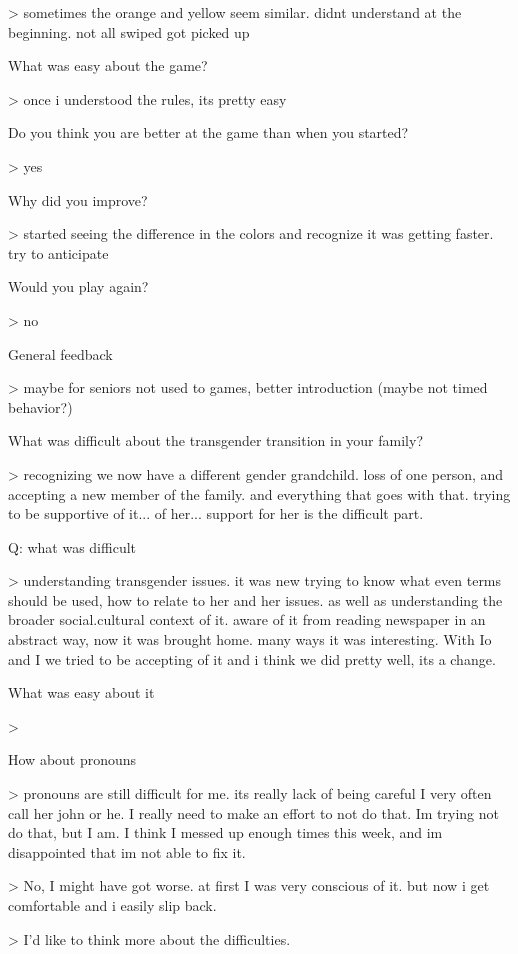     > sometimes the orange and yellow seem similar. didnt understand at the beginning. not all swiped got picked up

What was easy about the game?

    > once i understood the rules, its pretty easy
    
Do you think you are better at the game than when you started?

    > yes
    
Why did you improve?

    > started seeing the difference in the colors and recognize it was getting faster. try to anticipate
    
Would you play again?

    > no
    
General feedback

    > maybe for seniors not used to games, better introduction (maybe not timed behavior?)
    
What was difficult about the transgender transition in your family?
    
    > recognizing we now have a different gender grandchild. loss of one person, and accepting a new member of the family. and everything that goes with that. trying to be supportive of it... of her... support for her is the difficult part. 
    
    Q: what was difficult
    
        > understanding transgender issues. it was new trying to know what even terms should be used, how to relate to her and her issues. as well as understanding the broader social.cultural context of it. aware of it from reading newspaper in an abstract way, now it was brought home. many ways it was interesting. With Io and I we tried to be accepting of it and i think we did pretty well, its a change.

What was easy about it

    > 

How about pronouns

    > pronouns are still difficult for me. its really lack of being careful I very often call her john or he. I really need to make an effort to not do that. Im trying not do that, but I am. I think I messed up enough times this week, and im disappointed that im not able to fix it. 
    
    > No, I might have got worse. at first I was very conscious of it. but now i get comfortable and i easily slip back.
        
> I'd like to think more about the difficulties. 

